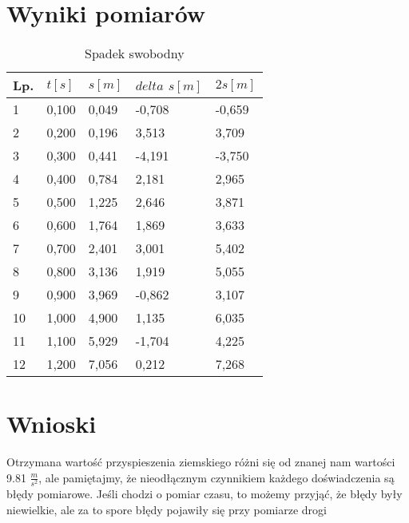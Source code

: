 \documentclass{article}
\begin{document}
\section{Wyniki pomiarów}
\begin{table}[hp]
\caption{Spadek swobodny}
\label{tab: Spadek_swobodny}
\begin{center}
\begin{tabular}{|l|l|l|l|l|}
\hline Lp. & $t[s]$ & $s[m]$ & $delta$ $s[m]$ & $2s[m]$\\
\hline
1 & 0,100 & 0,049 & -0,708 & -0,659\\\hline
2 & 0,200 & 0,196 & 3,513 & 3,709\\\hline
3 & 0,300 & 0,441 & -4,191 & -3,750\\\hline
4 & 0,400 & 0,784 & 2,181 & 2,965\\\hline
5 & 0,500 & 1,225 & 2,646 & 3,871\\\hline
6 & 0,600 & 1,764 & 1,869 & 3,633\\\hline
7 & 0,700 & 2,401 & 3,001 & 5,402\\\hline
8 & 0,800 & 3,136 & 1,919 & 5,055\\\hline
9 & 0,900 & 3,969 & -0,862 & 3,107\\\hline
10 & 1,000 & 4,900 & 1,135 & 6,035\\\hline
11 & 1,100 & 5,929 & -1,704 & 4,225\\\hline
12 & 1,200 & 7,056 & 0,212 & 7,268\\\hline
\end{tabular}
\end{center}
\end{table}



\newpage
\section{Wnioski}
Otrzymana wartość przyspieszenia ziemskiego różni się od znanej nam wartości 9.81 $\frac{m}{s^2}$, ale
pamiętajmy, że nieodłącznym czynnikiem każdego doświadczenia są błędy pomiarowe. Jeśli chodzi o
pomiar czasu, to możemy przyjąć, że błędy były niewielkie, ale za to spore błędy pojawiły się przy
pomiarze drogi
\end{document}
